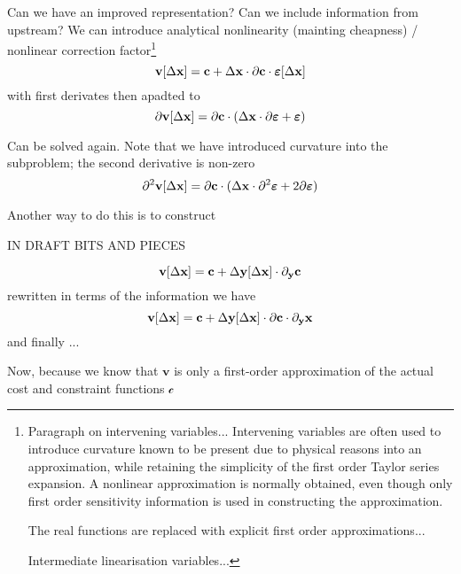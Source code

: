 \documentclass[11pt]{article}
\begin{document}
Can we have an improved representation? Can we include information from upstream? We can introduce analytical nonlinearity (mainting cheapness) / nonlinear correction factor\footnote{Paragraph on intervening variables... Intervening variables are often used to introduce curvature known to be present due to physical reasons into an approximation, while retaining the simplicity of the first order Taylor series expansion. A nonlinear
approximation is normally obtained, even though only
first order sensitivity information is used in constructing the approximation. 

The real functions are replaced with explicit first order approximations...

Intermediate linearisation variables...

}
\begin{equation}
\textbf{v}[\Delta \mathbf{x}] = \mathbf{c} + \Delta \mathbf{x} \cdot \partial \mathbf{c} \cdot \bm{\varepsilon}[\Delta \mathbf{x}]
\end{equation}
with first derivates then apadted to 
\begin{equation}
\partial \textbf{v}[\Delta \mathbf{x}] = \partial \mathbf{c} \cdot ( \Delta \mathbf{x} \cdot \partial \bm{\varepsilon} + \bm{\varepsilon})
\end{equation}

Can be solved again. Note that we have introduced curvature into the subproblem; the second derivative is non-zero
\begin{equation}
\partial^2 \textbf{v}[\Delta \mathbf{x}] = \partial \mathbf{c} \cdot ( \Delta \mathbf{x} \cdot \partial^2 \bm{\varepsilon} + 2 \partial \bm{\varepsilon})
\end{equation}

Another way to do this is to construct 


\newpage

IN DRAFT BITS AND PIECES

\begin{equation}
\textbf{v}[\Delta \mathbf{x}] = \mathbf{c} + \Delta \mathbf{y}[\Delta \mathbf{x}] \cdot \partial_{\mathbf{y}}\mathbf{c}
\end{equation}
rewritten in terms of the information we have
\begin{equation}
\textbf{v}[\Delta \mathbf{x}] = \mathbf{c} + \Delta \mathbf{y}[\Delta \mathbf{x}] \cdot \partial \mathbf{c} \cdot \partial_{\mathbf{y}} \mathbf{x}
\end{equation}
and finally ... 



Now, because we know that $\textbf{v}$ is only a first-order approximation of the actual cost and constraint functions $\mathcal{c}$
\end{document}
